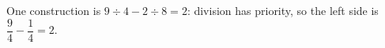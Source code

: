 One construction is $\boxed{9\div4-2\div8=2}$: division has priority, so the left side is $\dfrac{9}{4}-\dfrac{1}{4}=2 $.
